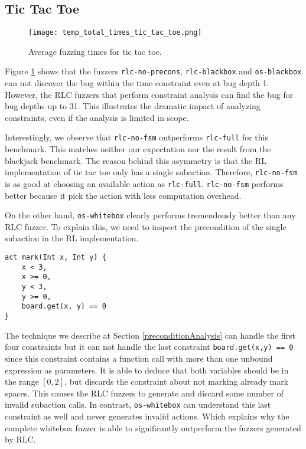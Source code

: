 \subsection{Tic Tac Toe}
\begin{figure}[h]
    \centering
    \texttt{[image: temp\_total\_times\_tic\_tac\_toe.png]}
    \caption{Average fuzzing times for tic tac toe.}
    \label{totalTimesTicTacToe}
\end{figure}
Figure \ref{totalTimesTicTacToe} shows that the fuzzers \texttt{rlc-no-precons}, \texttt{rlc-blackbox} and \texttt{os-blackbox} can not discover the bug within the time constraint even at bug depth 1.
However, the RLC fuzzers that perform constraint analysis can find the bug for bug depths up to 31.
This illustrates the dramatic impact of analyzing constraints, even if the analysis is limited in scope.

Interestingly, we observe that \texttt{rlc-no-fsm} outperforms \texttt{rlc-full} for this benchmark.
This matches neither our expectation nor the result from the blackjack benchmark.
The reason behind this asymmetry is that the RL implementation of tic tac toe only has a single subaction.
Therefore, \texttt{rlc-no-fsm} is as good at choosing an available action as \texttt{rlc-full}.
\texttt{rlc-no-fsm} performs better because it pick the action with less computation overhead.

On the other hand, \texttt{os-whitebox} clearly performs tremendously better than any RLC fuzzer.
To explain this, we need to inspect the precondition of the single subaction in the RL implementation.

\begin{lstlisting}
act mark(Int x, Int y) {
    x < 3,
    x >= 0,
    y < 3,
    y >= 0,
    board.get(x, y) == 0
}
\end{lstlisting}

The technique we describe at Section \ref{preconditionAnalysis} can handle the first four constraints but it 
 can not handle the last constraint \texttt{board.get(x,y) == 0} since this constraint contains a function call with more than one unbound expression as parameters.
It is able to deduce that both variables should be in the range $[0,2]$, but discards the constraint about not marking already mark spaces.
This causes the RLC fuzzers to generate and discard some number of invalid subaction calls.
In contrast, \texttt{os-whitebox} can understand this last constraint as well and never generates invalid actions.
Which explains why the complete whitebox fuzzer is able to significantly outperform the fuzzers generated by RLC.

